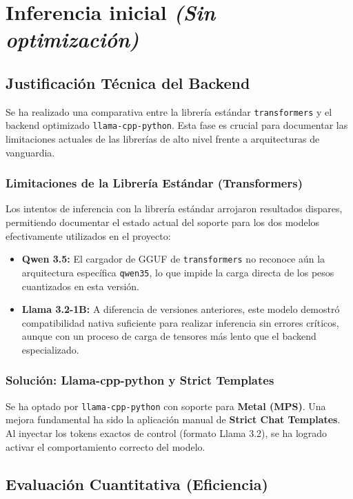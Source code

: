 \section{Inferencia inicial \textit{(Sin optimización)}}

\subsection{Justificación Técnica del Backend}

Se ha realizado una comparativa entre la librería estándar \texttt{transformers} y el backend optimizado \texttt{llama-cpp-python}. Esta fase es crucial para documentar las limitaciones actuales de las librerías de alto nivel frente a arquitecturas de vanguardia.

\subsubsection{Limitaciones de la Librería Estándar (Transformers)}

Los intentos de inferencia con la librería estándar arrojaron resultados dispares, permitiendo documentar el estado actual del soporte para los dos modelos efectivamente utilizados en el proyecto:
\begin{itemize}
    \item \textbf{Qwen 3.5:} El cargador de GGUF de \texttt{transformers} no reconoce aún la arquitectura específica \texttt{qwen35}, lo que impide la carga directa de los pesos cuantizados en esta versión.
    \item \textbf{Llama 3.2-1B:} A diferencia de versiones anteriores, este modelo demostró compatibilidad nativa suficiente para realizar inferencia sin errores críticos, aunque con un proceso de carga de tensores más lento que el backend especializado.
\end{itemize}

\subsubsection{Solución: Llama-cpp-python y Strict Templates}

Se ha optado por \texttt{llama-cpp-python} con soporte para \textbf{Metal (MPS)}. Una mejora fundamental ha sido la aplicación manual de \textbf{Strict Chat Templates}. Al inyectar los tokens exactos de control (formato Llama 3.2), se ha logrado activar el comportamiento correcto del modelo.

\subsection{Evaluación Cuantitativa (Eficiencia)}

